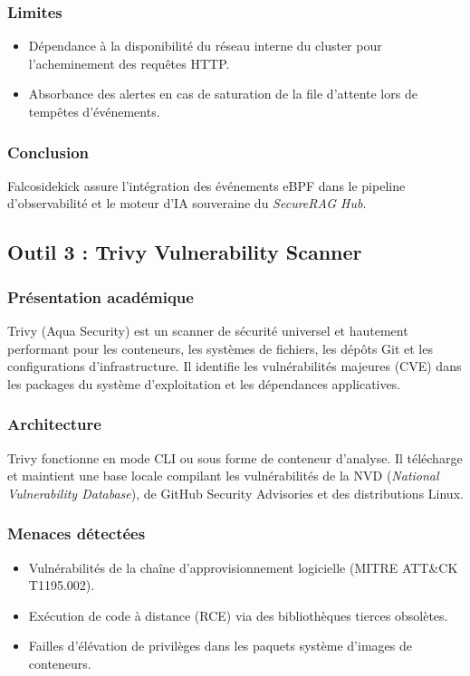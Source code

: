 \subsubsection{Limites}
\begin{itemize}
    \item Dépendance à la disponibilité du réseau interne du cluster pour l'acheminement des requêtes HTTP.
    \item Absorbance des alertes en cas de saturation de la file d'attente lors de tempêtes d'événements.
\end{itemize}

\subsubsection{Conclusion}
Falcosidekick assure l'intégration des événements eBPF dans le pipeline d'observabilité et le moteur d'IA souveraine du \textit{SecureRAG Hub}.

\subsection{Outil 3 : Trivy Vulnerability Scanner}
\label{subsec:outil_trivy}

\subsubsection{Présentation académique}
Trivy (Aqua Security) est un scanner de sécurité universel et hautement performant pour les conteneurs, les systèmes de fichiers, les dépôts Git et les configurations d'infrastructure. Il identifie les vulnérabilités majeures (CVE) dans les packages du système d'exploitation et les dépendances applicatives.

\subsubsection{Architecture}
Trivy fonctionne en mode CLI ou sous forme de conteneur d'analyse. Il télécharge et maintient une base locale compilant les vulnérabilités de la NVD (\textit{National Vulnerability Database}), de GitHub Security Advisories et des distributions Linux.

\subsubsection{Menaces détectées}
\begin{itemize}
    \item Vulnérabilités de la chaîne d'approvisionnement logicielle (MITRE ATT\&CK T1195.002).
    \item Exécution de code à distance (RCE) via des bibliothèques tierces obsolètes.
    \item Failles d'élévation de privilèges dans les paquets système d'images de conteneurs.
\end{itemize}

